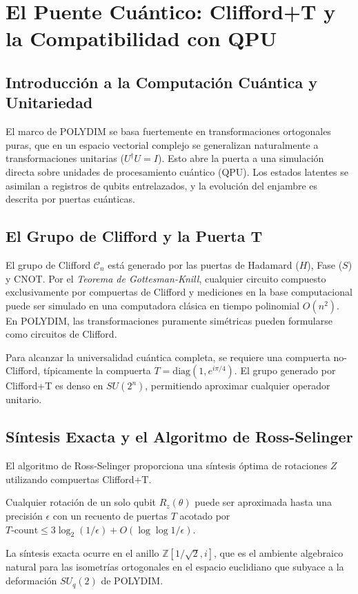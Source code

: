 \chapter{El Puente Cuántico: Clifford+T y la Compatibilidad con QPU}

\section{Introducción a la Computación Cuántica y Unitariedad}
El marco de POLYDIM se basa fuertemente en transformaciones ortogonales puras, que en un espacio vectorial complejo se generalizan naturalmente a transformaciones unitarias ($U^\dagger U = I$). Esto abre la puerta a una simulación directa sobre unidades de procesamiento cuántico (QPU). Los estados latentes se asimilan a registros de qubits entrelazados, y la evolución del enjambre es descrita por puertas cuánticas.

\section{El Grupo de Clifford y la Puerta T}
El grupo de Clifford $\mathcal{C}_n$ está generado por las puertas de Hadamard ($H$), Fase ($S$) y CNOT. Por el \emph{Teorema de Gottesman-Knill}, cualquier circuito compuesto exclusivamente por compuertas de Clifford y mediciones en la base computacional puede ser simulado en una computadora clásica en tiempo polinomial $O(n^2)$. En POLYDIM, las transformaciones puramente simétricas pueden formularse como circuitos de Clifford. 

Para alcanzar la universalidad cuántica completa, se requiere una compuerta no-Clifford, típicamente la compuerta $T = \text{diag}(1, e^{i\pi/4})$. El grupo generado por Clifford+T es denso en $SU(2^n)$, permitiendo aproximar cualquier operador unitario.

\section{Síntesis Exacta y el Algoritmo de Ross-Selinger}
El algoritmo de Ross-Selinger proporciona una síntesis óptima de rotaciones $Z$ utilizando compuertas Clifford+T.
\begin{theorem}
Cualquier rotación de un solo qubit $R_z(\theta)$ puede ser aproximada hasta una precisión $\epsilon$ con un recuento de puertas $T$ acotado por $T\text{-count} \le 3 \log_2(1/\epsilon) + O(\log \log 1/\epsilon)$.
\end{theorem}
La síntesis exacta ocurre en el anillo $\mathbb{Z}[1/\sqrt{2}, i]$, que es el ambiente algebraico natural para las isometrías ortogonales en el espacio euclidiano que subyace a la deformación $SU_q(2)$ de POLYDIM.

